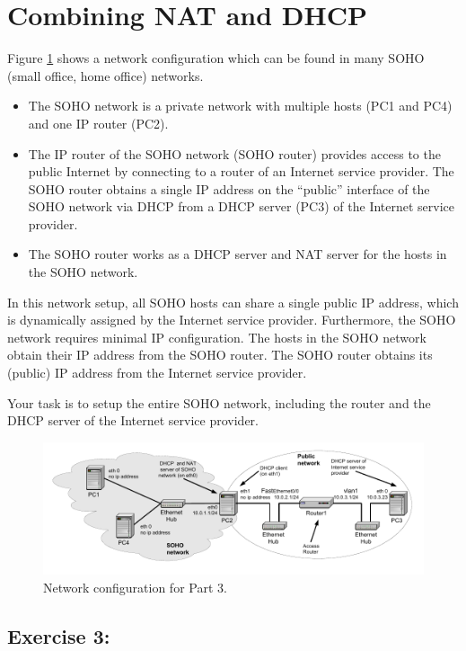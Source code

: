 \newpage
\section{Combining NAT and DHCP}

Figure \ref{fig:lab7-part3} shows a network configuration which can be found in many SOHO (small office, home office) networks.

\begin{itemize}
	\item The SOHO network is a private network with multiple hosts (PC1 and PC4) and one IP router (PC2).
	\item The IP router of the SOHO network (SOHO router) provides access to the public Internet by connecting to a router of an Internet service provider. The SOHO router obtains a single IP address on the “public” interface of the SOHO network via DHCP from a DHCP server (PC3) of the Internet service provider.
	\item The SOHO router works as a DHCP server and NAT server for the hosts in the SOHO network.
\end{itemize}

In this network setup, all SOHO hosts can share a single public IP address, which is dynamically assigned by the Internet service provider. Furthermore, the SOHO network requires minimal IP configuration. The hosts in the SOHO network obtain their IP address from the SOHO router. The SOHO router obtains its (public) IP address from the Internet service provider.

Your task is to setup the entire SOHO network, including the router and the DHCP server of the Internet service provider.

\begin{figure}[h!t]
	\centering
	\includegraphics{graphics/lab7-part3-updated.pdf}	
	\caption{Network configuration for Part 3.}
	\label{fig:lab7-part3}
\end{figure}

\subsection{Exercise 3:}


